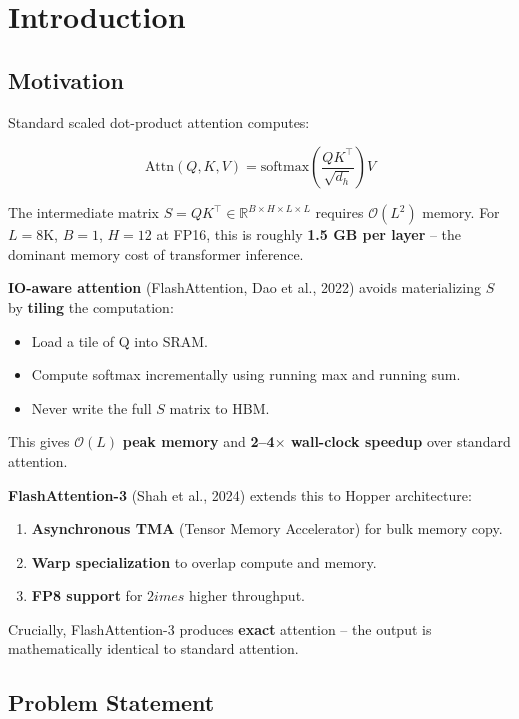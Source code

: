\section{Introduction}

\subsection{Motivation}

Standard scaled dot-product attention computes:

\[
\text{Attn}(Q, K, V) = \text{softmax}\!\left(\frac{Q K^\top}{\sqrt{d_h}}\right) V
\tag{1.1}
\]

The intermediate matrix $S = QK^\top \in \mathbb{R}^{B \times H \times L \times L}$ 
requires $\mathcal{O}(L^2)$ memory. For $L = 8\text{K}$, $B = 1$, $H = 12$ 
at FP16, this is roughly \textbf{1.5 GB per layer} -- the dominant memory cost 
of transformer inference.

\textbf{IO-aware attention} (FlashAttention, Dao et al., 2022) avoids 
materializing $S$ by \textbf{tiling} the computation:

\begin{itemize}
\item Load a tile of Q into SRAM.
\item Compute softmax incrementally using running max and running sum.
\item Never write the full $S$ matrix to HBM.

\end{itemize}
This gives $\mathcal{O}(L)$ \textbf{peak memory} and \textbf{2--4$\times$ wall-clock speedup} 
over standard attention.

\textbf{FlashAttention-3} (Shah et al., 2024) extends this to Hopper 
architecture:

\begin{enumerate}
\item \textbf{Asynchronous TMA} (Tensor Memory Accelerator) for bulk memory copy.
\item \textbf{Warp specialization} to overlap compute and memory.
\item \textbf{FP8 support} for $2	imes$ higher throughput.

\end{enumerate}
Crucially, FlashAttention-3 produces \textbf{exact} attention -- the output is 
mathematically identical to standard attention.

\subsection{Problem Statement}

